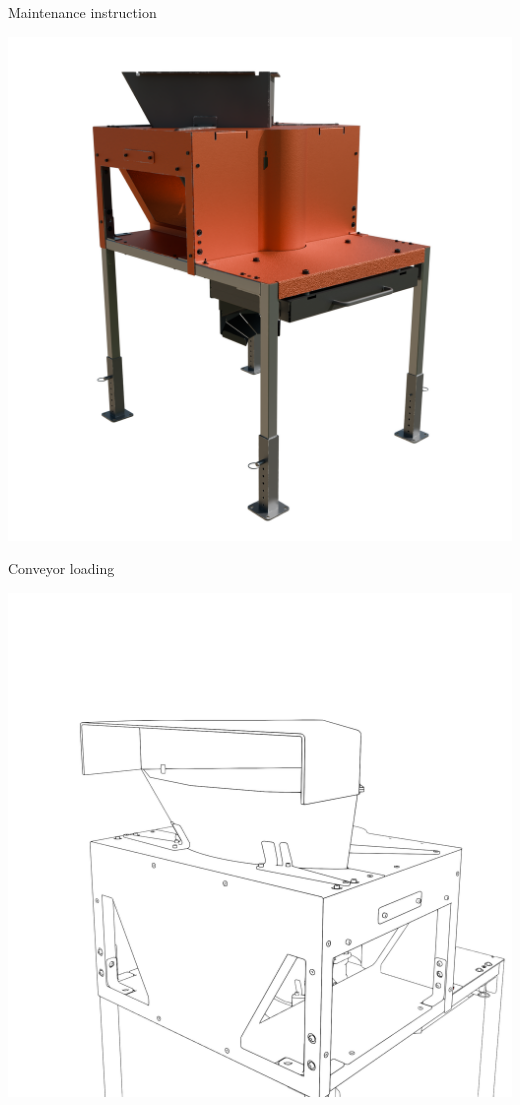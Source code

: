 \documentclass[a5paper,portrait]{article}
\begin{document}
\newpage


\vspace*{2cm}
        {\color{mainblue}\sffamily\Huge Maintenance instruction}\\[1cm]
\begin{center}
            \includegraphics[width=1\textwidth]{../images/Chap4_Assembly.png}
\end{center}
\newpage
\vspace*{2cm}
        {\color{mainblue}\sffamily\Huge Conveyor loading}\\[1cm]
\begin{center}
            \includegraphics[width=1\textwidth]{../images/Couvercle_Convoyeur.png}
\end{center}
\end{document}
